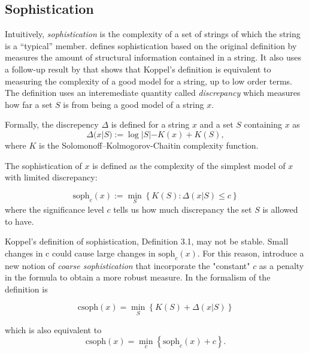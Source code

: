 \subsection{Sophistication}

Intuitively, \emph{sophistication} is the complexity of a set of strings of which
the string is a ``typical'' member.
\textcite{motaSophisticationRandomnessDeficiency2013} defines sophistication
based on the original definition by \textcite{koppelStructure1988,
  koppelAlmostMachineindependentTheory1991a} measures the amount of structural
information contained in a string. It also uses a follow-up result by
\parencite{vitanyiMeaningfulInformation2006} that shows that Koppel's definition
is equivalent to measuring the complexity of a good model for a string, up to
low order terms. The definition uses an interemediate quantity called
\emph{discrepancy} which measures how far a set $S$ is from being a good model
of a string $x$.

Formally, the discrepency $\Delta$ is defined for a string $x$ and a set $S$ containing $x$ as
\begin{equation}
  \label{eq:6}
  \Delta(x|S) := \log |S| - K(x) + K(S),
\end{equation}
where $K$ is the Solomonoff–Kolmogorov-Chaitin complexity function.

The sophistication of $x$ is defined as the complexity of the simplest model of
$x$ with limited discrepancy:

\begin{equation}
  \label{eq:7}
  \text{soph}_{c}(x) := \min_{S}\left\{ K(S): \Delta(x|S) \leq c \right\}
\end{equation}
where the significance level $c$ tells us how much discrepancy the set $S$ is allowed to have.

Koppel’s definition of sophistication, Definition 3.1, may not be stable. Small
changes in c could cause large changes in $\text{soph}_{c}(x)$. For this reason,
\textcite{antunesSophisticationRevisited2009} introduce a new notion of \emph{coarse
sophistication} that incorporate the "constant" $c$ as a penalty in the formula
to obtain a more robust measure.
In the formalism of \textcite{motaSophisticationRandomnessDeficiency2013} the
definition is

\begin{equation}
  \label{eq:8}
  \text{csoph}(x) = \min_{S}\left\{ K(S) + \Delta(x|S) \right\}
\end{equation}

which is also equivalent to
\begin{equation}
  \label{eq:8b}
  \text{csoph}(x) = \min_{c}\left\{ \text{soph}_{c}(x) + c \right\}.
\end{equation}

